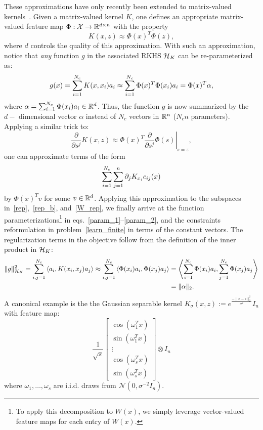 These approximations have only recently been extended to matrix-valued kernels~\cite{Minh2016,BraultHeinonenEtAl2016}. Given a matrix-valued kernel $K$, one defines an appropriate matrix-valued feature map $\Phi : \mathcal{X} \rightarrow \mathbb{R}^{d\times n}$ with the property 
\[
    K(x,z) \approx \Phi(x)^T \Phi(z),
\]
where $d$ controls the quality of this approximation. With such an approximation, notice that \emph{any} function $g$ in the associated RKHS $\mathcal{H}_{K}$ can be re-parameterized as:
\[
    g(x) = \sum_{i=1}^{N_c} K(x,x_i) a_i \approx \sum_{i=1}^{N_c} \Phi(x)^T \Phi(x_i) a_i = \Phi(x)^T \alpha,
\]
where $\alpha = \sum_{i=1}^{N_c} \Phi(x_i)a_i \in \mathbb{R}^d$. Thus, the function $g$ is now summarized by the $d-$ dimensional vector $\alpha$ instead of $N_c$ vectors in $\mathbb{R}^n$ ($N_c n$ parameters). 
Applying a similar trick to:
\[
    \dfrac{\partial}{\partial s^j} K(x,z) \approx \left. \Phi(x)^T \dfrac{\partial}{\partial s^j} \Phi(s) \right|_{s =z},
\]
one can approximate terms of the form
\[
    \sum_{i=1}^{N_c}\sum_{j=1}^{n} \partial_j K_{x_i} c_{ij} (x)
\]
by $\Phi(x)^T v$ for some $v \in \mathbb{R}^d$. Applying this approximation to the subspaces in~\eqref{rep},~\eqref{rep_b}, and~\eqref{W_rep}, we finally arrive at the function parameterizations\footnote{To apply this decomposition to $W(x)$, we simply leverage vector-valued feature maps for each entry of $W(x)$.} in eqs.~\eqref{param_1}--\eqref{param_2}, and the constraints reformulation in problem~\eqref{learn_finite} in terms of the constant vectors. The regularization terms in the objective follow from the definition of the inner product in $\mathcal{H}_{K}$:
\small{
\[ 
\begin{split}
    \|g\|_{\mathcal{H}_{K}}^2 = \sum_{i,j=1}^{N_c} \left\langle a_i, K(x_i,x_j)a_j \right\rangle \approx \sum_{i,j=1}^{N_c} \left\langle \Phi(x_i)a_i, \Phi(x_j)a_j \right\rangle &= \left\langle \sum_{i=1}^{N_c}\Phi(x_i)a_i, \sum_{j=1}^{N_c}\Phi(x_j)a_j \right\rangle \\
    &= \|\alpha\|_2.
\end{split}
\]
}\normalsize
A canonical example is the the Gaussian separable kernel $K_{\sigma}(x,z) := e^{\frac{-\|x-z\|_2^2}{\sigma^2}} I_n$ with feature map:
\[
    \dfrac{1}{\sqrt{s}}\begin{bmatrix} \cos(\omega_1^T x) \\ \sin(\omega_1^T x) \\ \vdots \\ \cos(\omega_s^T x) \\ \sin(\omega_s^T x)    \end{bmatrix} \otimes I_n 
\]
where $\omega_1,\ldots,\omega_s$ are i.i.d. draws from $\mathcal{N}(0,\sigma^{-2}I_n)$. 

